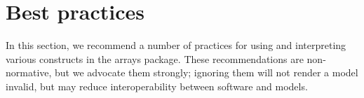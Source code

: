 
\section{Best practices}
\label{best-practices}

In this section, we recommend a number of practices for using and
interpreting various constructs in the arrays package.
These recommendations are non-normative, but we advocate them strongly;
ignoring them will not render a model invalid, but may reduce
interoperability between software and models.






